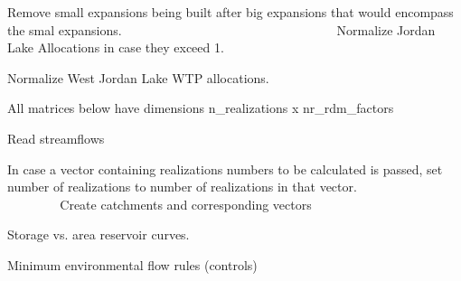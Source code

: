 Remove small expansions being built after big expansions that would encompass the smal expansions. ~\newline
~\newline
~\newline
~\newline
~\newline
~\newline
~\newline
~\newline
~\newline
~\newline
~\newline
~\newline
~\newline
~\newline
~\newline
~\newline
~\newline
~\newline
~\newline
~\newline
 Normalize Jordan Lake Allocations in case they exceed 1.

Normalize West Jordan Lake W\+TP allocations.

All matrices below have dimensions n\+\_\+realizations x nr\+\_\+rdm\+\_\+factors

Read streamflows

In case a vector containing realizations numbers to be calculated is passed, set number of realizations to number of realizations in that vector. ~\newline
~\newline
~\newline
~\newline
~\newline
~\newline
~\newline
~\newline
~\newline
~\newline
~\newline
~\newline
~\newline
~\newline
~\newline
 Create catchments and corresponding vectors

Storage vs. area reservoir curves.

Minimum environmental flow rules (controls)

